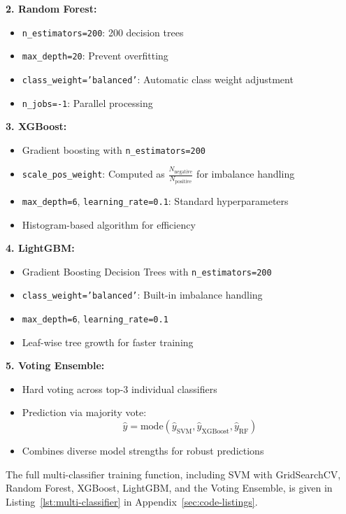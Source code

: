 \documentclass[11pt, titlepage, bibliography=totoc]{scrreprt}
\begin{document}
\textbf{2. Random Forest:}
\begin{itemize}
    \item \texttt{n\_estimators=200}: 200 decision trees
    \item \texttt{max\_depth=20}: Prevent overfitting
    \item \texttt{class\_weight='balanced'}: Automatic class weight adjustment
    \item \texttt{n\_jobs=-1}: Parallel processing
\end{itemize}

\textbf{3. XGBoost:}
\begin{itemize}
    \item Gradient boosting with \texttt{n\_estimators=200}
    \item \texttt{scale\_pos\_weight}: Computed as $\frac{N_{\text{negative}}}{N_{\text{positive}}}$ for imbalance handling
    \item \texttt{max\_depth=6}, \texttt{learning\_rate=0.1}: Standard hyperparameters
    \item Histogram-based algorithm for efficiency
\end{itemize}

\textbf{4. LightGBM:}
\begin{itemize}
    \item Gradient Boosting Decision Trees with \texttt{n\_estimators=200}
    \item \texttt{class\_weight='balanced'}: Built-in imbalance handling
    \item \texttt{max\_depth=6}, \texttt{learning\_rate=0.1}
    \item Leaf-wise tree growth for faster training
\end{itemize}

\textbf{5. Voting Ensemble:}
\begin{itemize}
    \item Hard voting across top-3 individual classifiers
    \item Prediction via majority vote:
    \begin{equation}
    \hat{y} = \text{mode}(\hat{y}_{\text{SVM}}, \hat{y}_{\text{XGBoost}}, \hat{y}_{\text{RF}})
    \end{equation}
    \item Combines diverse model strengths for robust predictions
\end{itemize}

The full multi-classifier training function, including SVM with GridSearchCV, Random Forest, XGBoost, LightGBM, and the Voting Ensemble, is given in Listing~\ref{lst:multi-classifier} in Appendix~\ref{sec:code-listings}.
\end{document}
